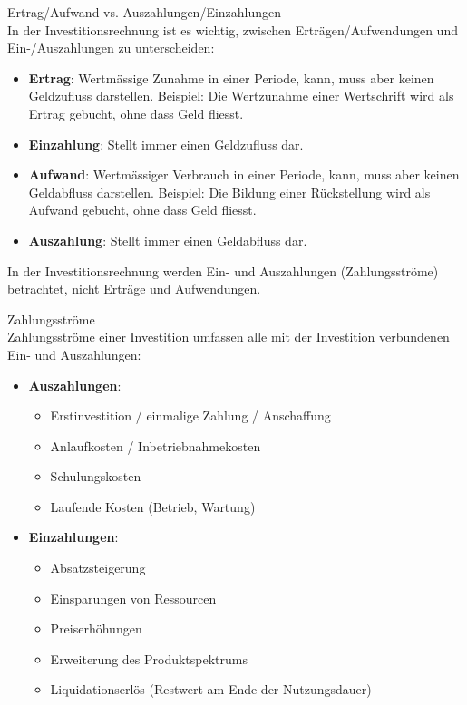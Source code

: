\begin{concept}{Ertrag/Aufwand vs. Auszahlungen/Einzahlungen}\\
In der Investitionsrechnung ist es wichtig, zwischen Erträgen/Aufwendungen und Ein-/Auszahlungen zu unterscheiden:
\begin{itemize}
    \item \textbf{Ertrag}: Wertmässige Zunahme in einer Periode, kann, muss aber keinen Geldzufluss darstellen. Beispiel: Die Wertzunahme einer Wertschrift wird als Ertrag gebucht, ohne dass Geld fliesst.
    \item \textbf{Einzahlung}: Stellt immer einen Geldzufluss dar.
    \item \textbf{Aufwand}: Wertmässiger Verbrauch in einer Periode, kann, muss aber keinen Geldabfluss darstellen. Beispiel: Die Bildung einer Rückstellung wird als Aufwand gebucht, ohne dass Geld fliesst.
    \item \textbf{Auszahlung}: Stellt immer einen Geldabfluss dar.
\end{itemize}

In der Investitionsrechnung werden Ein- und Auszahlungen (Zahlungsströme) betrachtet, nicht Erträge und Aufwendungen.
\end{concept}

\begin{definition}{Zahlungsströme}\\
Zahlungsströme einer Investition umfassen alle mit der Investition verbundenen Ein- und Auszahlungen:
\begin{itemize}
    \item \textbf{Auszahlungen}:
    \begin{itemize}
        \item Erstinvestition / einmalige Zahlung / Anschaffung
        \item Anlaufkosten / Inbetriebnahmekosten
        \item Schulungskosten
        \item Laufende Kosten (Betrieb, Wartung)
    \end{itemize}
    \item \textbf{Einzahlungen}:
    \begin{itemize}
        \item Absatzsteigerung
        \item Einsparungen von Ressourcen
        \item Preiserhöhungen
        \item Erweiterung des Produktspektrums
        \item Liquidationserlös (Restwert am Ende der Nutzungsdauer)
    \end{itemize}
\end{itemize}
\end{definition}

